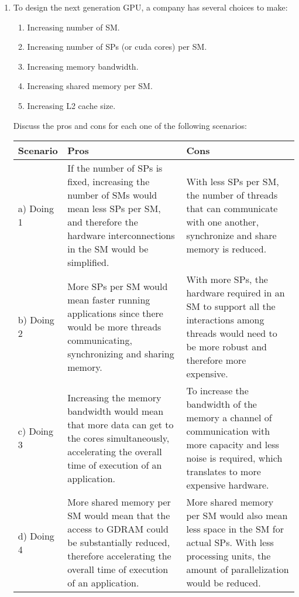 \documentclass{article}
\begin{document}
\begin{enumerate}[1.]
    
    \item To design the next generation GPU, a company has several choices to make:
    \begin{enumerate}[1)]
        \item Increasing number of SM.
        \item Increasing number of SPs (or cuda cores) per SM.
        \item Increasing memory bandwidth.
        \item Increasing shared memory per SM.
        \item Increasing L2 cache size.
    \end{enumerate}
    Discuss the pros and cons for each one of the following scenarios:
    \begin{table}[h!t]
	\centering
	\begin{tabular}{p{1.5cm}p{6cm}p{6cm}}
		\toprule
		\textbf{Scenario} & \textbf{Pros} & \textbf{Cons}\\
		\midrule
		a) Doing 1 &
		If the number of SPs is fixed, increasing the number of SMs would mean less SPs per SM, and therefore the hardware interconnections in the SM would be simplified. & 
		With less SPs per SM, the number of threads that can communicate with one another, synchronize and share memory is reduced. \\
		\midrule
		b) Doing 2 &
		More SPs per SM would mean faster running applications since there would be more threads communicating, synchronizing and sharing memory. & 
		With more SPs, the hardware required in an SM to support all the interactions among threads would need to be more robust and therefore more expensive. \\
		\midrule
		c) Doing 3 &
		Increasing the memory bandwidth would mean that more data can get to the cores simultaneously, accelerating the overall time of execution of an application. & 
		To increase the bandwidth of the memory a channel of communication with more capacity and less noise is required, which translates to more expensive hardware. \\
		\midrule
		d) Doing 4 &
		More shared memory per SM would mean that the access to GDRAM could be substantially reduced, therefore accelerating the overall time of execution of an application. & 
		More shared memory per SM would also mean less space in the SM for actual SPs. With less processing units, the amount of parallelization would be reduced. \\

\end{tabular}
\end{table}
\end{enumerate}
\end{document}
